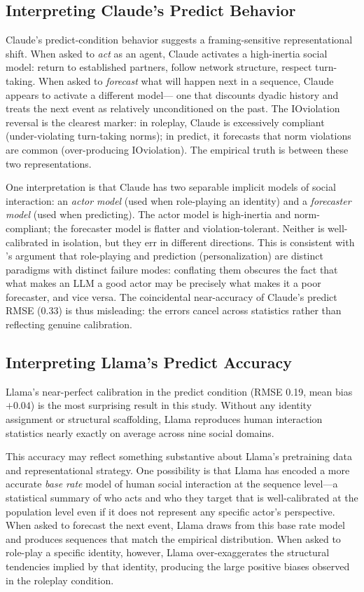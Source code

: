 \documentclass[11pt]{article}
\begin{document}
\subsection{Interpreting Claude's Predict Behavior}

Claude's predict-condition behavior suggests a framing-sensitive
representational shift. When asked to \emph{act} as an agent, Claude
activates a high-inertia social model: return to established partners, follow
network structure, respect turn-taking. When asked to \emph{forecast} what
will happen next in a sequence, Claude appears to activate a different model---
one that discounts dyadic history and treats the next event as relatively
unconditioned on the past. The IOviolation reversal is the clearest marker:
in roleplay, Claude is excessively compliant (under-violating turn-taking
norms); in predict, it forecasts that norm violations are common (over-producing
IOviolation). The empirical truth is between these two representations.

One interpretation is that Claude has two separable implicit models of
social interaction: an \emph{actor model} (used when role-playing an identity)
and a \emph{forecaster model} (used when predicting). The actor model is
high-inertia and norm-compliant; the forecaster model is flatter and
violation-tolerant. Neither is well-calibrated in isolation, but they err
in different directions. This is consistent with \citet{tseng2024two}'s
argument that role-playing and prediction (personalization) are distinct
paradigms with distinct failure modes: conflating them obscures the fact
that what makes an LLM a good actor may be precisely what makes it a poor
forecaster, and vice versa. The coincidental near-accuracy of Claude's
predict RMSE (0.33) is thus misleading: the errors cancel across statistics
rather than reflecting genuine calibration.

\subsection{Interpreting Llama's Predict Accuracy}

Llama's near-perfect calibration in the predict condition (RMSE 0.19,
mean bias $+0.04$) is the most surprising result in this study. Without
any identity assignment or structural scaffolding, Llama reproduces human
interaction statistics nearly exactly on average across nine social domains.

This accuracy may reflect something substantive about Llama's pretraining
data and representational strategy. One possibility is that Llama has
encoded a more accurate \emph{base rate} model of human social interaction
at the sequence level---a statistical summary of who acts and who they target
that is well-calibrated at the population level even if it does not represent
any specific actor's perspective. When asked to forecast the next event,
Llama draws from this base rate model and produces sequences that match the
empirical distribution. When asked to role-play a specific identity, however,
Llama over-exaggerates the structural tendencies implied by that identity,
producing the large positive biases observed in the roleplay condition.
\end{document}
